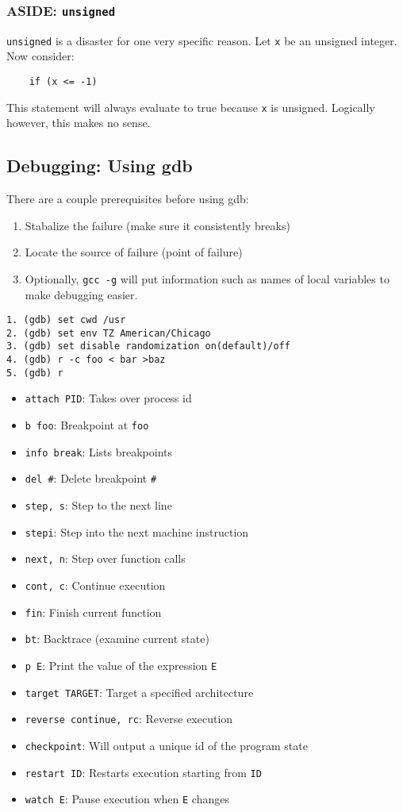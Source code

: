\documentclass[13pt]{article}
\begin{document}
\subsubsection*{ASIDE: \texttt{unsigned}}
\texttt{unsigned} is a disaster for one very specific reason. Let \texttt{x} be an unsigned integer. Now consider:
\begin{verbatim}
    if (x <= -1)
\end{verbatim}
This statement will always evaluate to true because \texttt{x} is unsigned. Logically however, this makes no sense.





\subsection{Debugging: Using gdb}
There are a couple prerequisites before using gdb:
\begin{enumerate}[label=(\arabic*)]
\item Stabalize the failure (make sure it consistently breaks)
\item Locate the source of failure (point of failure)
\item Optionally, \texttt{gcc -g} will put information such as names of local variables to make debugging easier.
\end{enumerate}
\begin{verbatim}
1. (gdb) set cwd /usr
2. (gdb) set env TZ American/Chicago
3. (gdb) set disable randomization on(default)/off
4. (gdb) r -c foo < bar >baz
5. (gdb) r
\end{verbatim}
\begin{itemize}[label=(\texttt{gdb}),leftmargin=*]
\item \texttt{attach PID}: Takes over process id
\item \texttt{b foo}: Breakpoint at \texttt{foo}
\item \texttt{info break}: Lists breakpoints
\item \texttt{del \#}: Delete breakpoint \texttt{\#}
\item \texttt{step, s}: Step to the next line
\item \texttt{stepi}: Step into the next machine instruction
\item \texttt{next, n}: Step over function calls
\item \texttt{cont, c}: Continue execution
\item \texttt{fin}: Finish current function
\item \texttt{bt}: Backtrace (examine current state)
\item \texttt{p E}: Print the value of the expression \texttt{E}
\item \texttt{target TARGET}: Target a specified architecture
\item \texttt{reverse continue, rc}: Reverse execution
\item \texttt{checkpoint}: Will output a unique id of the program state
\item \texttt{restart ID}: Restarts execution starting from \texttt{ID}
\item \texttt{watch E}: Pause execution when \texttt{E} changes
\end{itemize}
\end{document}
